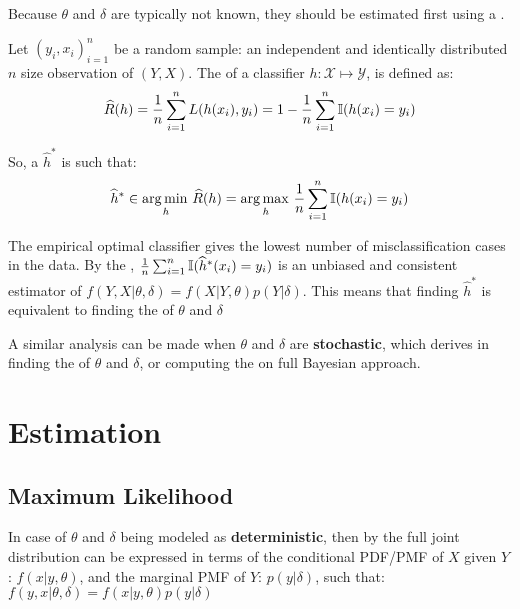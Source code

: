Because $\theta$ and $\delta$ are typically not known, they should be estimated first using a .

Let $(y_i,x_i)_{i=1}^n$ be a random sample: an independent and identically distributed $n$ size observation of $(Y,X)$. The  of a classifier $h:\mathcal{X}\mapsto\mathcal{Y}$, is defined as:
\begin{equation*}
   \widehat{R}(h) = \frac{1}{n} \sum_{i=1}^n L(h({x}_i),y_i) = 1-\frac{1}{n}\sum_{i=1}^{n}\operatorname{\mathbb{I}}(h({x}_i)=y_i)
\end{equation*}

So, a  $\widehat{h}^*$ is such that:
\begin{equation*}
    \widehat{h}^* \in 
    \operatorname*{arg\,min\,}_{h} \widehat{R}(h) = \operatorname*{arg\,max\,}_{h}\frac{1}{n}\sum_{i=1}^{n}\operatorname{\mathbb{I}}(h(x_i)=y_i)
\end{equation*}

The empirical optimal classifier gives the lowest number of misclassification cases in the data. By the , $\frac{1}{n}\sum_{i=1}^{n}\operatorname{\mathbb{I}}(\widehat{h}^*({x}_i)=y_i)$ is an unbiased and consistent estimator of $f(Y,X|\theta,\delta)=f(X|Y,\theta)p(Y|\delta)$. This means that finding $\widehat{h}^*$ is equivalent to finding the  of $\theta$ and $\delta$

A similar analysis can be made when $\theta$ and $\delta$ are \textbf{stochastic}, which derives in finding the  of $\theta$ and $\delta$, or computing the  on full Bayesian approach.





\section{Estimation}
\subsection{Maximum Likelihood}
In case of $\theta$ and $\delta$ being modeled as \textbf{deterministic}, then by  the full joint distribution can be expressed in terms of the conditional PDF/PMF of $X$ given $Y$: $f(x|y,\theta)$, and the marginal PMF of $Y$: $p(y|\delta)$, such that: 
$f(y,x|\theta,\delta) = f(x|y,\theta)p(y|\delta)$

